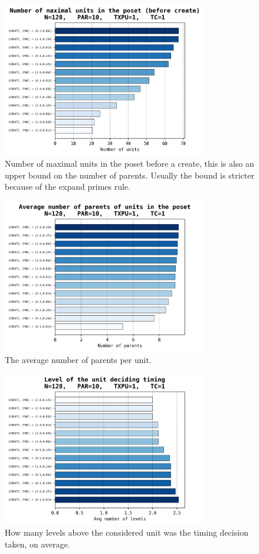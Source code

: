 \documentclass[a4paper,10pt]{article}
\begin{document}
			\begin{figure}[h]
				\centering
				\includegraphics[width=0.8\textwidth]{bar_plots/final_exp1/n_maximal.png}
				\caption{Number of maximal units in the poset before a create, this is also an upper bound on the number of parents. Usually the bound is stricter because of the expand primes rule.}
				\label{fig:delaysMaximalPreCreate}
			\end{figure}
			\begin{figure}[h]
				\centering
				\includegraphics[width=0.8\textwidth]{bar_plots/final_exp1/n_parents.png}
				\caption{The average number of parents per unit.}
				\label{fig:delaysParents}
			\end{figure}
			\begin{figure}[h]
				\centering
				\includegraphics[width=0.8\textwidth]{bar_plots/final_exp1/decision_height.png}
				\caption{How many levels above the considered unit was the timing decision taken, on average.}
				\label{fig:delaysDecisionUnit}
			\end{figure}
\end{document}
